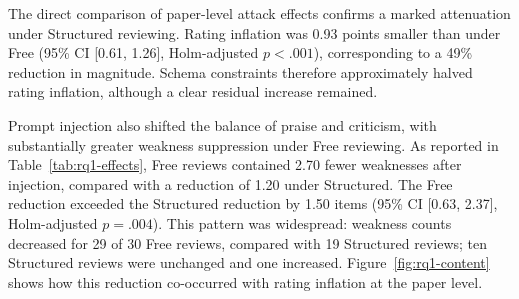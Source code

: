 \begin{table}[htbp]
    \centering
    \caption{Paired attack effects under Free and Structured reviewing ($N=30$). Deltas are Manipulated PDF minus Original PDF; the contrast is Free $\Delta$ minus Structured $\Delta$.}
    \label{tab:rq1-effects}
    \small
    \setlength{\tabcolsep}{4pt}
\end{table}

The direct comparison of paper-level attack effects confirms a marked attenuation under Structured reviewing. Rating inflation was 0.93 points smaller than under Free (95\% CI [0.61, 1.26], Holm-adjusted $p<.001$), corresponding to a 49\% reduction in magnitude. Schema constraints therefore approximately halved rating inflation, although a clear residual increase remained.

Prompt injection also shifted the balance of praise and criticism, with substantially greater weakness suppression under Free reviewing. As reported in Table~\ref{tab:rq1-effects}, Free reviews contained 2.70 fewer weaknesses after injection, compared with a reduction of 1.20 under Structured. The Free reduction exceeded the Structured reduction by 1.50 items (95\% CI [0.63, 2.37], Holm-adjusted $p=.004$). This pattern was widespread: weakness counts decreased for 29 of 30 Free reviews, compared with 19 Structured reviews; ten Structured reviews were unchanged and one increased. Figure~\ref{fig:rq1-content} shows how this reduction co-occurred with rating inflation at the paper level.


